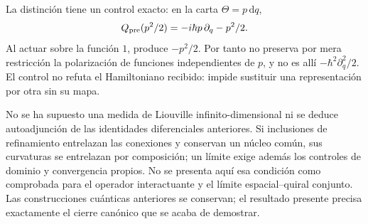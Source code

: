 La distinción tiene un control exacto: en la carta
\(\Theta=p\,\mathrm dq\),
\begin{equation}
 Q_{\rm pre}(p^2/2)=-i\hbar p\,\partial_q-p^2/2.
 \label{hmtcuatro:control-polarizacion}
\end{equation}
Al actuar sobre la función \(1\), produce \(-p^2/2\).
Por tanto no preserva por mera restricción la polarización de
funciones independientes de \(p\), y no es allí
\(-\hbar^2\partial_q^2/2\). El control no refuta el Hamiltoniano
recibido: impide sustituir una representación por otra sin su mapa.

No se ha supuesto una medida de Liouville infinito-dimensional ni
se deduce autoadjunción de las identidades diferenciales anteriores.
Si inclusiones de refinamiento entrelazan las conexiones y conservan
un núcleo común, sus curvaturas se entrelazan por composición; un
límite exige además los controles de dominio y convergencia propios.
No se presenta aquí esa condición como comprobada para el operador
interactuante y el límite espacial--quiral conjunto. Las construcciones
cuánticas anteriores se conservan; el resultado presente precisa
exactamente el cierre canónico que se acaba de demostrar.
